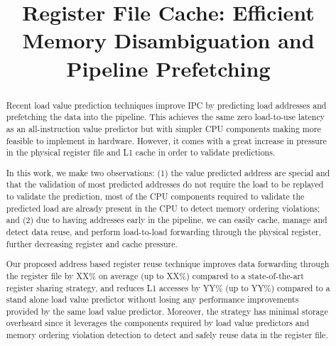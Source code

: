 \documentclass{sig-alternate}
\title{Register File Cache: Efficient Memory Disambiguation and Pipeline Prefetching}
\begin{document}
\maketitle
\thispagestyle{firstpage}
\pagestyle{plain}




\begin{abstract}
Recent load value prediction techniques improve IPC by predicting load addresses and prefetching the data into the pipeline. This achieves the same zero load-to-use latency as an all-instruction value predictor but with simpler CPU components making more feasible to implement in hardware. However, it comes with a great increase in pressure in the physical register file and L1 cache in order to validate predictions. %

In this work, we make two observations: (1) the value predicted address are special and that the validation of most predicted addresses do not require the load to be replayed to validate the prediction, most of the CPU components required to validate the predicted load are already present in the CPU to detect memory ordering violations; and (2) due to having addresses early in the pipeline, we can easily cache, manage and detect data reuse, and perform load-to-load forwarding through the physical register, further decreasing register and cache pressure. %

Our proposed address based register reuse technique improves data forwarding through the register file by XX\% on average (up to XX\%) compared to a state-of-the-art register sharing strategy, and reduces L1 accesses by YY\% (up to YY\%) compared to a stand alone load value predictor without losing any performance improvements provided by the same load value predictor. Moreover, the strategy has minimal storage overheard since it leverages the components required by load value predictors and memory ordering violation detection to detect and safely reuse data in the register file.


\end{abstract}
\end{document}
